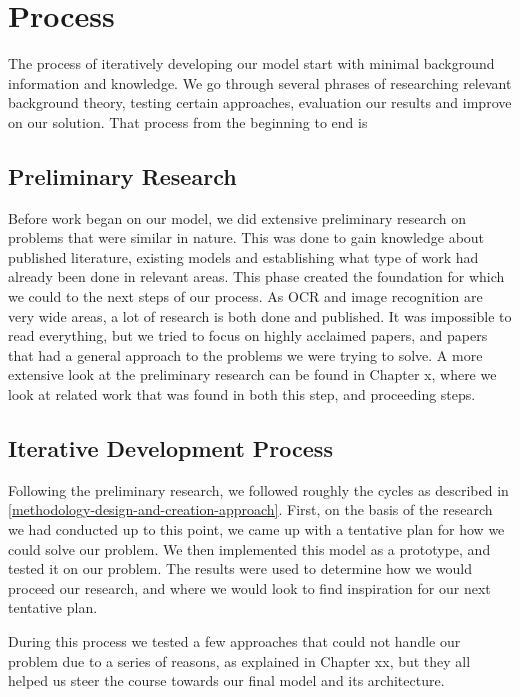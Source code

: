 

\section{Process}
The process of iteratively developing our model start with minimal background information and knowledge. We go through several phrases of researching relevant background theory, testing certain approaches, evaluation our results and improve on our solution. That process from the beginning to end is 

\subsection{Preliminary Research}
Before work began on our model, we did extensive preliminary research on problems that were similar in nature. This was done to gain knowledge about published literature, existing models and establishing what type of work had already been done in relevant areas. This phase created the foundation for which we could to the next steps of our process. As OCR and image recognition are very wide areas, a lot of research is both done and published. It was impossible to read everything, but we tried to focus on highly acclaimed papers, and papers that had a general approach to the problems we were trying to solve. A more extensive look at the preliminary research can be found in Chapter x, where we look at related work that was found in both this step, and proceeding steps.

\subsection{Iterative Development Process}
Following the preliminary research, we followed roughly the cycles as described in \ref{methodology-design-and-creation-approach}. First, on the basis of the research we had conducted up to this point, we came up with a tentative plan for how we could solve our problem. We then implemented this model as a prototype, and tested it on our problem. The results were used to determine how we would proceed our research, and where we would look to find inspiration for our next tentative plan.

During this process we tested a few approaches that could not handle our problem due to a series of reasons, as explained in Chapter xx, but they all helped us steer the course towards our final model and its architecture.

